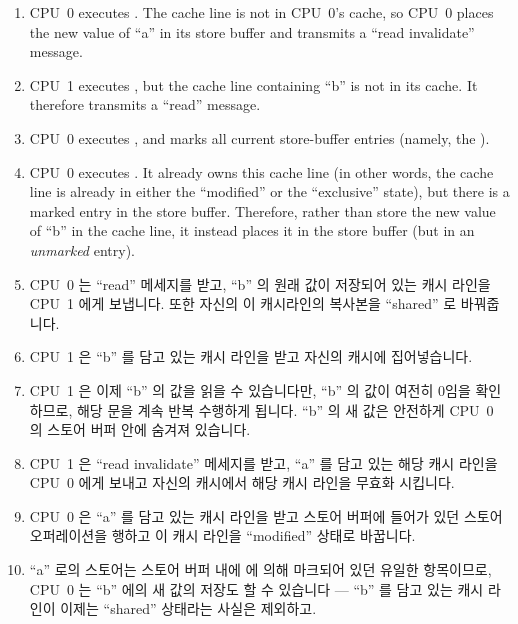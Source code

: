 \begin{enumerate}
\item	CPU~0 executes .  The cache line is not in
	CPU~0's cache, so CPU~0 places the new value of ``a'' in its
	store buffer and transmits a ``read invalidate'' message.
\item	CPU~1 executes , but the cache line
	containing ``b'' is not in its cache.
	It therefore transmits a ``read'' message.
\item	CPU~0 executes , and marks all current store-buffer
	entries (namely, the ).
\item	CPU~0 executes .
	It already owns this cache line (in other words, the cache line
	is already in either the ``modified'' or the ``exclusive'' state),
	but there is a marked entry in the store buffer.
	Therefore, rather than store the new value of ``b'' in the
	cache line, it instead places it in the store buffer (but
	in an \emph{unmarked} entry).
\fi
\item	CPU~0 는 ``read'' 메세지를 받고, ``b'' 의 원래 값이 저장되어 있는 캐시
	라인을 CPU~1 에게 보냅니다.
	또한 자신의 이 캐시라인의 복사본을 ``shared'' 로 바꿔줍니다.
\item	CPU~1 은 ``b'' 를 담고 있는 캐시 라인을 받고 자신의 캐시에
	집어넣습니다.
\item	CPU~1 은 이제 ``b'' 의 값을 읽을 수 있습니다만, ``b'' 의 값이 여전히
	0임을 확인하므로, 해당  문을 계속 반복 수행하게 됩니다.
	``b'' 의 새 값은 안전하게 CPU~0 의 스토어 버퍼 안에 숨겨져 있습니다.
\item	CPU~1 은 ``read invalidate'' 메세지를 받고, ``a'' 를 담고 있는 해당
	캐시 라인을 CPU~0 에게 보내고 자신의 캐시에서 해당 캐시 라인을 무효화
	시킵니다.
\item	CPU~0 은 ``a'' 를 담고 있는 캐시 라인을 받고 스토어 버퍼에 들어가 있던
	스토어 오퍼레이션을 행하고 이 캐시 라인을 ``modified'' 상태로 바꿉니다.
\item	``a'' 로의 스토어는 스토어 버퍼 내에  에 의해 마크되어
	있던 유일한 항목이므로, CPU~0 는 ``b'' 에의 새 값의 저장도 할 수
	있습니다 --- ``b'' 를 담고 있는 캐시 라인이 이제는 ``shared'' 상태라는
	사실은 제외하고.
\iffalse


\end{enumerate}
